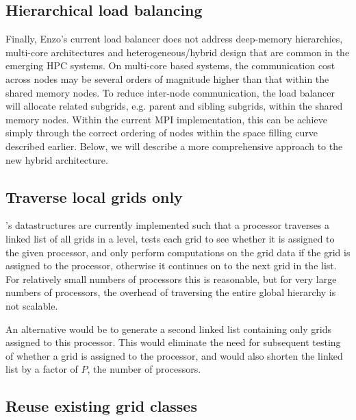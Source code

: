 \documentclass{article}
\begin{document}
\subsection{Hierarchical load balancing}\label{solution:amr-balance-hierarchical}

Finally, Enzo's current load balancer does not address deep-memory
hierarchies, multi-core architectures and heterogeneous/hybrid design
that are common in the emerging HPC systems. On multi-core based
systems, the communication cost across nodes may be several orders of
magnitude higher than that within the shared memory nodes. To reduce
inter-node communication, the load balancer will allocate related
subgrids, e.g. parent and sibling subgrids, within the shared memory
nodes.  Within the current MPI implementation, this can be achieve
simply through the correct ordering of nodes within the space filling
curve described earlier.  Below, we will describe a more comprehensive
approach to the new hybrid architecture.

\subsection{Traverse local grids only}\label{solution:amr-traversal-local}

  \enzo's datastructures are currently implemented such that a
  processor traverses a linked list of all grids in a level, tests
  each grid to see whether it is assigned to the given processor, and
  only perform computations on the grid data if the grid is assigned
  to the processor, otherwise it continues on to the next grid in the
  list.  For relatively small numbers of processors this is
  reasonable, but for very large numbers of processors, the overhead
  of traversing the entire global hierarchy is not scalable.

  An alternative would be to generate a second linked list containing
  only grids assigned to this processor.  This would eliminate the
  need for subsequent testing of whether a grid is assigned to the
  processor, and would also shorten the linked list by a factor of
  $P$, the number of processors.

\subsection{Reuse existing grid classes} \label{solution:amr-grid-reuse}
\end{document}
